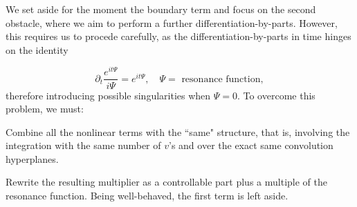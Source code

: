 \documentclass[%
11pt,  reqno]{amsart}
\newcommand{\5}{\textup{V}}
\newcommand{\noi}{\noindent}
\theoremstyle{remark}
\numberwithin{equation}{section}
\numberwithin{theorem}{section}
\begin{document}
\medskip
We set aside for the moment the boundary term and focus on the second obstacle, where we aim to perform a further differentiation-by-parts. However, this requires us to procede carefully, as the differentiation-by-parts in time hinges on the identity
	
	
	$$\partial_t\frac{e^{it\Psi}}{i\Psi} = {e^{it\Psi}}, \quad \Psi=\mbox{ resonance function},
	$$
	therefore introducing possible singularities when $\Psi=0$. To overcome this problem, we must:

    \smallskip
\noi{\bf Step 1.}
    Combine all the nonlinear terms with the ``same" structure, that is, involving the integration with the same number of $v$'s and over the exact same convolution hyperplanes. 
  
    \smallskip
\noi{\bf Step 2.}
    Rewrite the resulting multiplier as a controllable part plus a multiple of the resonance function. Being well-behaved, the first term is left aside.
      
\end{document}
